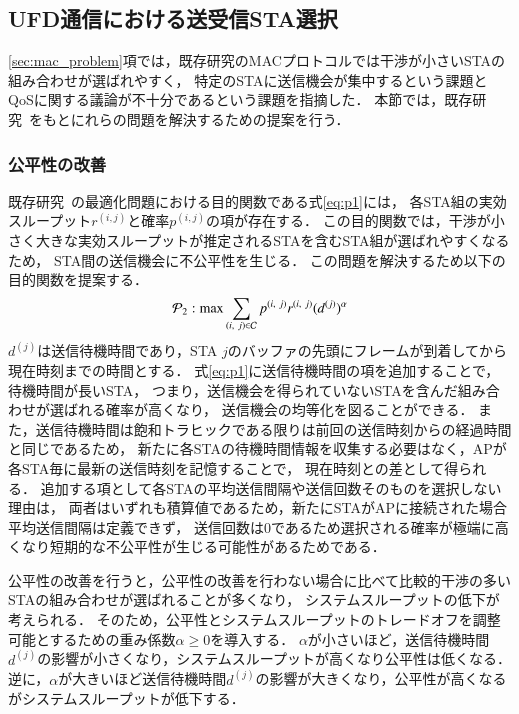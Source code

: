 \documentclass[master]{kuisthesis}		%
\newcommand{\sij}{(i,j)}
\newcommand{\pij}{p^{(i,j)}}
\newcommand{\rij}{r^{\sij}}
\begin{document}
	\subsection{UFD通信における送受信STA選択}\label{sec:ufd_propose}
		\ref{sec:mac_problem}項では，既存研究のMACプロトコルでは干渉が小さいSTAの組み合わせが選ばれやすく，
		特定のSTAに送信機会が集中するという課題とQoSに関する議論が不十分であるという課題を指摘した．
		本節では，既存研究~\cite{promac}をもとにれらの問題を解決するための提案を行う．

		\subsubsection{公平性の改善}\label{sec:fair}
			既存研究~\cite{promac}の最適化問題における目的関数である式\eqref{eq:p1}には，
			各STA組の実効スループット$\rij$と確率$\pij$の項が存在する．
			この目的関数では，干渉が小さく大きな実効スループットが推定されるSTAを含むSTA組が選ばれやすくなるため，
			STA間の送信機会に不公平性を生じる．
			この問題を解決するため以下の目的関数を提案する．
			\begin{equation}
				{\mathcal P}_2: {\rm max} \sum_{(i,\ j)\in{\mathcal C}} p^{(i,\ j)}r^{(i,\ j)}(d^{(j)})^{\alpha} 	\label{eq:p2}
			\end{equation}
			$d^{(j)}$は送信待機時間であり，STA $j$のバッファの先頭にフレームが到着してから現在時刻までの時間とする．
			式\eqref{eq:p1}に送信待機時間の項を追加することで，待機時間が長いSTA，
			つまり，送信機会を得られていないSTAを含んだ組み合わせが選ばれる確率が高くなり，
			送信機会の均等化を図ることができる．
			また，送信待機時間は飽和トラヒックである限りは前回の送信時刻からの経過時間と同じであるため，
			新たに各STAの待機時間情報を収集する必要はなく，APが各STA毎に最新の送信時刻を記憶することで，
			現在時刻との差として得られる．
			追加する項として各STAの平均送信間隔や送信回数そのものを選択しない理由は，
			両者はいずれも積算値であるため，新たにSTAがAPに接続された場合平均送信間隔は定義できず，
			送信回数は0であるため選択される確率が極端に高くなり短期的な不公平性が生じる可能性があるためである．
			\par
			公平性の改善を行うと，公平性の改善を行わない場合に比べて比較的干渉の多いSTAの組み合わせが選ばれることが多くなり，
			システムスループットの低下が考えられる．
			そのため，公平性とシステムスループットのトレードオフを調整可能とするための重み係数$\alpha\geq 0$を導入する．
			$\alpha$が小さいほど，送信待機時間$d^{(j)}$の影響が小さくなり，システムスループットが高くなり公平性は低くなる．
			逆に，$\alpha$が大きいほど送信待機時間$d^{(j)}$の影響が大きくなり，公平性が高くなるがシステムスループットが低下する．
\end{document}
